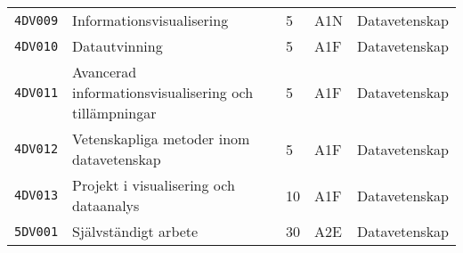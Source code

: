 {\begin{tabular}[]{@{}lllll@{}}
\midrule
\texttt{4DV009} & Informationsvisualisering                             & 5   & A1N & Datavetenskap \tabularnewline 
\texttt{4DV010} & Datautvinning                                         & 5   & A1F & Datavetenskap \tabularnewline 
\texttt{4DV011} & Avancerad informationsvisualisering och tillämpningar & 5   & A1F & Datavetenskap \tabularnewline 
\texttt{4DV012} & Vetenskapliga metoder inom datavetenskap              & 5   & A1F & Datavetenskap \tabularnewline 
\texttt{4DV013} & Projekt i visualisering och dataanalys                & 10  & A1F & Datavetenskap \tabularnewline 
\texttt{5DV001} & Självständigt arbete                                  & 30  & A2E & Datavetenskap \tabularnewline 
\bottomrule
\end{tabular}
}
\pagebreak 

